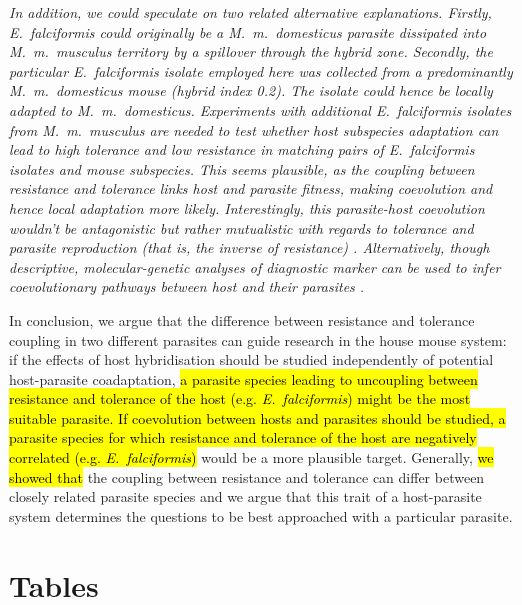 \documentclass[12pt]{article}
\begin{document}
\textit{\small{In addition, we could speculate on two related alternative explanations. Firstly, \textit{E.~falciformis} could originally be a \textit{M.~m.~domesticus} parasite dissipated into \textit{M.~m.~musculus} territory by a spillover through the hybrid zone. Secondly, the particular \textit{E.~falciformis} isolate employed here was collected from a predominantly \textit{M.~m.~domesticus} mouse (hybrid index 0.2). The isolate could hence be locally adapted to \textit{M.~m.~domesticus}. Experiments with additional \textit{E.~falciformis} isolates from \textit{M.~m.~musculus} are needed to test whether host subspecies adaptation can lead to high tolerance and low resistance in matching pairs of \textit{E.~falciformis} isolates and mouse subspecies. This seems plausible, as the coupling between resistance and tolerance links host and parasite fitness, making coevolution and hence local adaptation more likely. Interestingly, this parasite-host coevolution wouldn’t be antagonistic but rather mutualistic with regards to tolerance and parasite reproduction (that is, the inverse of resistance) \citep{little_coevolution_2010, raaberg_decomposing_2009}. Alternatively, though descriptive, molecular-genetic analyses of diagnostic marker can be used to infer coevolutionary pathways between host and their parasites \parencite[e.g. ][]{kvac_coevolution_2013,gouy_de_bellocq_holobiont_2018}.}}
\par

In conclusion, we argue that the difference between resistance and tolerance coupling in two different parasites can guide research in the house mouse system: if the effects of host hybridisation should be studied independently of potential host-parasite coadaptation, \hl{a parasite species leading to uncoupling between resistance and tolerance of the host (e.g. \textit{E.~falciformis}) might be the most suitable parasite. If coevolution between hosts and parasites should be studied, a parasite species for which resistance and tolerance of the host are negatively correlated (e.g. \textit{E.~falciformis})} would be a more plausible target. Generally, \hl{we showed that} the coupling between resistance and tolerance can differ between closely related parasite species and we argue that this trait of a host-parasite system determines the questions to be best approached with a particular parasite. 

\printbibliography

\section*{Tables}
\end{document}
